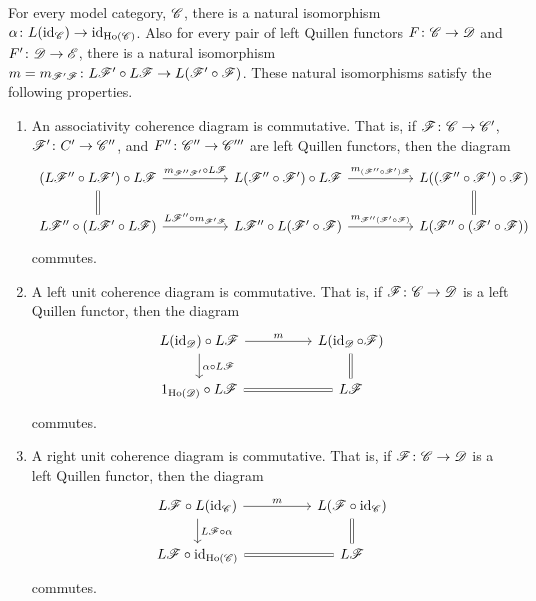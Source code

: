 \documentclass[10pt]{amsart}
\begin{document}
\newcommand{\E}{\mathscr{E}}
\begin{thm}
  For every model category, $\mathscr{C}$, there is a natural isomorphism $\alpha \colon L(\operatorname{id}_{\mathscr{C}}) \to \operatorname{id}_{\operatorname{Ho}\left(\mathscr{C}\right)}$.
  Also for every pair of left Quillen functors $F \colon \mathscr{C} \to \mathscr{D}$ and $F^\prime \colon \D \to \E$, there is a natural isomorphism $m = m_{\mathscr{F}^\prime\mathscr{F}} \colon L\mathscr{F}^\prime \circ L\mathscr{F} \to L(\mathscr{F}^\prime \circ \mathscr{F})$.
  These natural isomorphisms satisfy the following properties.
  \begin{enumerate}
  \item
    An associativity coherence diagram is commutative.
    That is, if $\mathscr{F} \colon \mathscr{C} \to \mathscr{C}^\prime$, $\mathscr{F}^\prime \colon C^\prime \to \mathscr{C}^{\prime\prime}$, and $F^{\prime\prime} \colon \mathscr{C}^{\prime\prime} \to \mathscr{C}^{\prime\prime\prime}$ are left Quillen functors, then the diagram
    $$\begin{tikzcd}
      \arrow[equals]{d}(L\F^{\prime\prime} \circ L\F^\prime) \circ L\F \arrow{rr}{m_{\F^{\prime\prime}\F^\prime} \circ L\F} && L(\F^{\prime\prime} \circ \F^\prime) \circ L\F \arrow{rr}{m_{(\F^{\prime\prime} \circ \F^\prime)\F}} && L((\F^{\prime\prime} \circ \F^\prime) \circ \F)\arrow[equals]{d}\\
      L\F^{\prime\prime} \circ (L\F^\prime \circ L\F) \arrow{rr}{L\F^{\prime\prime} \circ m_{\F^\prime\F}} && L\F^{\prime\prime} \circ L(\F^\prime \circ \F) \arrow{rr}{m_{\F^{\prime\prime}(\F^\prime \circ \F)}} && L(\F^{\prime\prime} \circ (\F^\prime \circ \F))
    \end{tikzcd}$$
    commutes.
  \item
    A left unit coherence diagram is commutative.
    That is, if $\mathscr{F} \colon \mathscr{C} \to \mathscr{D}$ is a left Quillen functor, then the diagram
    $$\begin{tikzcd}
      L(\id_\D) \circ L\F \arrow{rr}{m}\arrow{d}{\alpha \circ L\F} && L(\id_\D \circ \F) \arrow[equals]{d}\\
      1_{\Ho{\D}} \circ L\F \arrow[equals]{rr} && L\F
    \end{tikzcd}$$
    commutes.
  \item
    A right unit coherence diagram is commutative.
    That is, if $\mathscr{F} \colon \mathscr{C} \to \mathscr{D}$ is a left Quillen functor, then the diagram
    $$\begin{tikzcd}
      L\F \circ L(\id_{\C}) \arrow{rr}{m}\arrow{d}{L\F \circ \alpha} & & L(\F \circ \id_\C)\arrow[equals]{d}\\
      L\F \circ \id_{\Ho{\C}} \arrow[equals]{rr} && L\F
    \end{tikzcd}$$
    commutes.
  \end{enumerate}


\end{thm}
\end{document}
